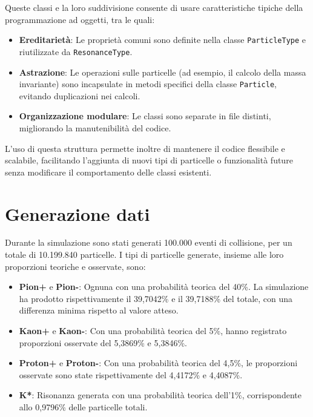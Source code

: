 \documentclass[a4paper,11pt]{article}
\begin{document}
Queste classi e la loro suddivisione consente di usare caratteristiche tipiche della programmazione ad oggetti, tra le quali:

\begin{itemize}
    \item \textbf{Ereditarietà}: Le proprietà comuni sono definite nella classe \texttt{ParticleType} e riutilizzate da \texttt{ResonanceType}.
    \item \textbf{Astrazione}: Le operazioni sulle particelle (ad esempio, il calcolo della massa invariante) sono incapsulate in metodi specifici della classe \texttt{Particle}, evitando duplicazioni nei calcoli.
    \item \textbf{Organizzazione modulare}: Le classi sono separate in file distinti, migliorando la manutenibilità del codice.
\end{itemize}

L'uso di questa struttura permette inoltre di mantenere il codice flessibile e scalabile, facilitando l'aggiunta di nuovi tipi di particelle o funzionalità future senza modificare il comportamento delle classi esistenti.

\clearpage

\section{Generazione dati}

Durante la simulazione sono stati generati 100.000 eventi di collisione, per un totale di 10.199.840 particelle. I tipi di particelle generate, insieme alle loro proporzioni teoriche e osservate, sono:

\begin{itemize}
    \item \textbf{Pion+} e \textbf{Pion-}: Ognuna con una probabilità teorica del 40\%. La simulazione ha prodotto rispettivamente il 39,7042\% e il 39,7188\% del totale, con una differenza minima rispetto al valore atteso.
    \item \textbf{Kaon+} e \textbf{Kaon-}: Con una probabilità teorica del 5\%, hanno registrato proporzioni osservate del 5,3869\% e 5,3846\%.
    \item \textbf{Proton+} e \textbf{Proton-}: Con una probabilità teorica del 4,5\%, le proporzioni osservate sono state rispettivamente del 4,4172\% e 4,4087\%.
    \item \textbf{K*}: Risonanza generata con una probabilità teorica dell'1\%, corrispondente allo 0,9796\% delle particelle totali.
\end{itemize}
\end{document}
